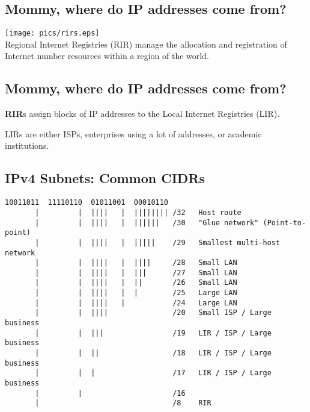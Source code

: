 \documentclass[xga]{xdvislides}
\begin{document}
\subsection{Mommy, where do IP addresses come from?}
\vspace*{\fill}
\begin{center}
	\texttt{[image: pics/rirs.eps]} \\
	\vspace{.5in}
	Regional Internet Registries (RIR) manage the allocation and
registration of Internet number resources within a region of the world.
\end{center}
\vspace*{\fill}

\subsection{Mommy, where do IP addresses come from?}
\vspace*{\fill}
\begin{center}
{\bf RIR}s assign blocks of IP addresses to the Local Internet Registries (LIR).
\\
\vspace{.5in}

LIRs are either ISPs, enterprises using a lot of addresses, or academic
institutions.
\end{center}
\vspace*{\fill}

\subsection{IPv4 Subnets: Common CIDRs}
\begin{verbatim}
10011011  11110110  01011001  00010110
       |         |  ||||   |  |||||||| /32   Host route
       |         |  ||||   |  ||||||   /30   "Glue network" (Point-to-point)
       |         |  ||||   |  |||||    /29   Smallest multi-host network
       |         |  ||||   |  ||||     /28   Small LAN
       |         |  ||||   |  |||      /27   Small LAN
       |         |  ||||   |  ||       /26   Small LAN
       |         |  ||||   |  |        /25   Large LAN
       |         |  ||||   |           /24   Large LAN
       |         |  ||||               /20   Small ISP / Large business
       |         |  |||                /19   LIR / ISP / Large business
       |         |  ||                 /18   LIR / ISP / Large business
       |         |  |                  /17   LIR / ISP / Large business
       |         |                     /16
       |                               /8    RIR
\end{verbatim}
\end{document}
